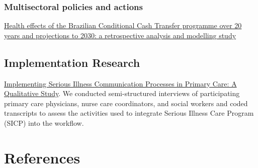 \documentclass[
  letterpaper,
  DIV=11,
  numbers=noendperiod]{scrreprt}
\newlength{\cslhangindent}
\newenvironment{CSLReferences}[2] %
 {\begin{list}{}{%
  \setlength{\itemindent}{0pt}
  \setlength{\leftmargin}{0pt}
  \setlength{\parsep}{0pt}
  \ifodd #1
   \setlength{\leftmargin}{\cslhangindent}
   \setlength{\itemindent}{-1\cslhangindent}
  \fi
  \setlength{\itemsep}{#2\baselineskip}}}
 {\end{list}}
\begin{document}
\subsection{Multisectoral policies and
actions}\label{multisectoral-policies-and-actions}

\href{https://www.thelancet.com/journals/lanpub/article/PIIS2468-2667\%2825\%2900091-X/fulltext}{Health
effects of the Brazilian Conditional Cash Transfer programme over 20
years and projections to 2030: a retrospective analysis and modelling
study}

\section{Implementation Research}\label{implementation-research}

\href{https://pubmed.ncbi.nlm.nih.gov/32794412/}{Implementing Serious
Illness Communication Processes in Primary Care: A Qualitative Study}.
We conducted semi-structured interviews of participating primary care
physicians, nurse care coordinators, and social workers and coded
transcripts to assess the activities used to integrate Serious Illness
Care Program (SICP) into the workflow.


\chapter*{References}\label{references}


\label{refs}
\begin{CSLReferences}{0}{1}
\end{CSLReferences}
\end{document}
